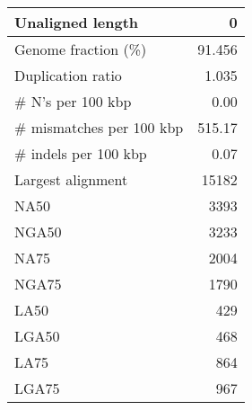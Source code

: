 \documentclass[12pt,a4paper]{article}
\begin{document}
\begin{table}[ht]
\begin{center}
\begin{tabular}{|l*{1}{|r}|}
Unaligned length & 0 \\ \hline
Genome fraction (\%) & 91.456 \\ \hline
Duplication ratio & 1.035 \\ \hline
\# N's per 100 kbp & 0.00 \\ \hline
\# mismatches per 100 kbp & 515.17 \\ \hline
\# indels per 100 kbp & 0.07 \\ \hline
Largest alignment & 15182 \\ \hline
NA50 & 3393 \\ \hline
NGA50 & 3233 \\ \hline
NA75 & 2004 \\ \hline
NGA75 & 1790 \\ \hline
LA50 & 429 \\ \hline
LGA50 & 468 \\ \hline
LA75 & 864 \\ \hline
LGA75 & 967 \\ \hline
\end{tabular}
\end{center}
\end{table}
\end{document}
